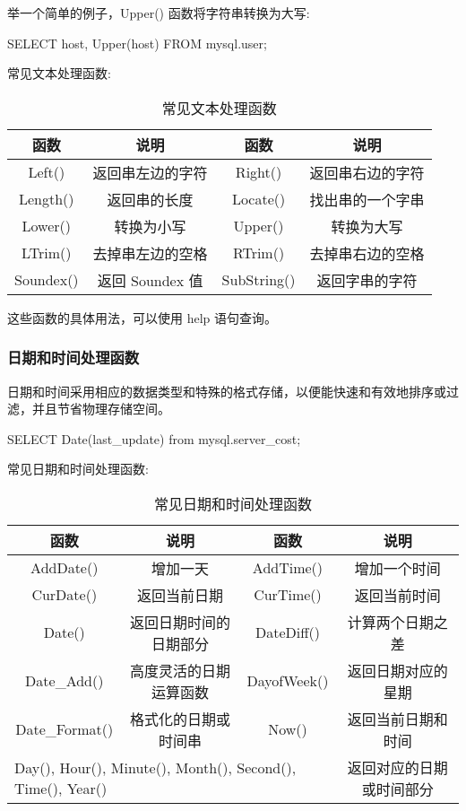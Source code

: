举一个简单的例子，Upper() 函数将字符串转换为大写:
\begin{sql}
SELECT host, Upper(host) FROM mysql.user;
\end{sql}

常见文本处理函数:

\begin{table}[H]
    \centering
    \caption{常见文本处理函数}
    \label{table:常见文本处理函数}
    \setlength{\tabcolsep}{4mm}
    \begin{tabular}{cc|cc}
        \toprule
        \textbf{函数} & \textbf{说明} & \textbf{函数} & \textbf{说明} \\
        \midrule
        Left() & 返回串左边的字符 & Right() & 返回串右边的字符 \\
        Length() & 返回串的长度 & Locate() & 找出串的一个字串 \\
        Lower() & 转换为小写 & Upper() & 转换为大写 \\
        LTrim() & 去掉串左边的空格 & RTrim() & 去掉串右边的空格 \\
        Soundex() & 返回 Soundex 值 & SubString() & 返回字串的字符 \\
        \bottomrule
    \end{tabular}
\end{table}

这些函数的具体用法，可以使用 help 语句查询。

\subsubsection{日期和时间处理函数}

日期和时间采用相应的数据类型和特殊的格式存储，以便能快速和有效地排序或过滤，并且节省物理存储空间。

\begin{sql}
SELECT Date(last_update) from mysql.server_cost;
\end{sql}

常见日期和时间处理函数:

\begin{table}[H]
    \centering
    \caption{常见日期和时间处理函数}
    \label{table:常见日期和时间处理函数}
    \setlength{\tabcolsep}{4mm}
    \begin{tabular}{cc|cc}
        \toprule
        \textbf{函数} & \textbf{说明} & \textbf{函数} & \textbf{说明} \\
        \midrule
        AddDate() & 增加一天 & AddTime() & 增加一个时间 \\
        CurDate() & 返回当前日期 & CurTime() & 返回当前时间 \\
        Date() & 返回日期时间的日期部分 & DateDiff() & 计算两个日期之差 \\
        Date\_Add() & 高度灵活的日期运算函数 & DayofWeek() & 返回日期对应的星期 \\
        Date\_Format() & 格式化的日期或时间串 & Now() & 返回当前日期和时间 \\
        \midrule
        \multicolumn{3}{l}{Day(), Hour(), Minute(), Month(), Second(), Time(), Year()} & 返回对应的日期或时间部分 \\
        \bottomrule
    \end{tabular}
\end{table}

